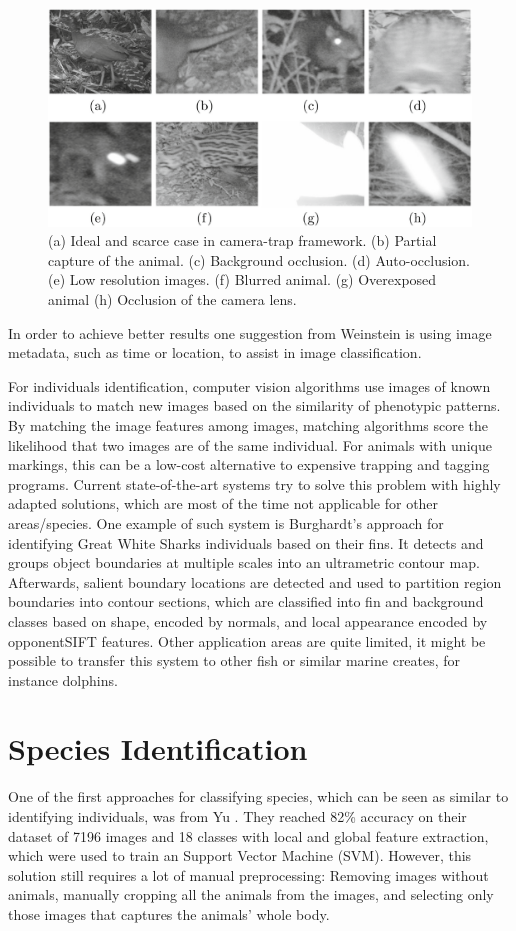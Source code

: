 \documentclass[electronic]{vgtc}             %
\begin{document}
	\begin{figure}[h]
		\includegraphics[width=.48\textwidth]{quality}
		\caption{(a) Ideal and scarce case in camera-trap framework. (b) Partial capture of
			the animal. (c) Background occlusion. (d) Auto-occlusion. (e) Low resolution images.
			(f) Blurred animal. (g) Overexposed animal (h) Occlusion of the camera lens.\cite{Gomez:2016:Low}}
		\label{fig:quality}
	\end{figure}

	In order to achieve better results one suggestion from Weinstein \cite{Weinstein:2017} is using image metadata, such as time or location, to assist in image	classification.
	
	For individuals identification, computer vision algorithms use images of known individuals to match new images based on the similarity of phenotypic patterns. 
	By matching the image features among images, matching algorithms score the likelihood that two images are of the same individual. 
	For animals with unique markings, this can be a low-­cost alternative to expensive trapping and tagging programs.
	Current state-of-the-art systems try to solve this problem with highly adapted solutions, which are most of the time not applicable for other areas/species.
	One example of such system is Burghardt's \cite{Burghardt:2016} approach for identifying Great White Sharks individuals based on their fins. 
	It detects and groups object boundaries at multiple scales into an ultrametric contour map.
	Afterwards, salient boundary locations are detected and used to partition region boundaries into contour sections, which  are classified into fin and background classes based on shape, encoded by normals, and local appearance encoded by opponentSIFT features. 
	Other application areas are quite limited, it might be possible to transfer this system to other fish or similar marine creates, for instance dolphins. 
	
	\section{Species Identification}
	
	One of the first approaches for classifying species, which can be seen as similar to identifying individuals, was from Yu \cite{Yu:2013}.
	They reached 82\% accuracy on their dataset of 7196 images and 18 classes with local and global feature extraction, which were used to train an Support Vector Machine (SVM).
	However, this solution still requires a lot of manual preprocessing:
	Removing images without animals, manually cropping all the animals from the images, and selecting only those images that captures the animals' whole body.
	
\end{document}

